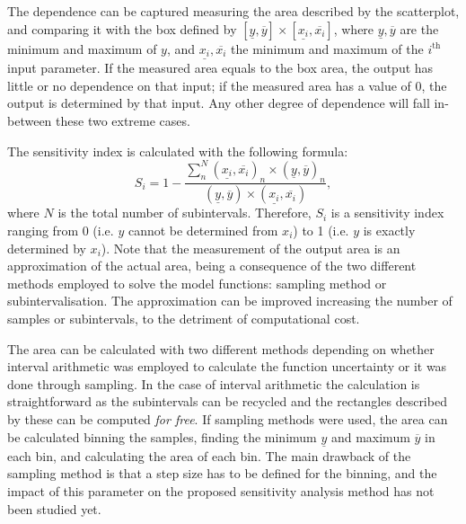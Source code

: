 \documentclass[twocolumn]{rps-esrel2022}
\begin{document}
The dependence can be captured measuring the area described by the scatterplot, and comparing it with the box defined by $[\underline{y},\overline{y}]\times[\underline{x_i},\overline{x_i}]$, where $\underline{y},\overline{y}$ are the minimum and maximum of $y$, and $\underline{x_i},\overline{x_i}$ the minimum and maximum of the $i^{\text{th}}$ input parameter.
If the measured area equals to the box area, the output has little or no dependence on that input;
if the measured area has a value of 0, the output is determined by that input. Any other degree of dependence will fall in-between these two extreme cases.

The sensitivity index is calculated with the following formula:
%
\begin{equation}
	S_i = 1 - \frac{\sum_n^N(\underline{x_i},\overline{x_i})_n\times(\underline{y},\overline{y})_n}{(\underline{y},\overline{y})\times(\underline{x_i},\overline{x_i})}{,}
\label{eq1}
\end{equation}
%
\noindent where $N$ is the total number of subintervals.
Therefore, $S_i$ is a sensitivity index ranging from 0 (i.e. $y$ cannot be determined from $x_i$) to 1 (i.e. $y$ is exactly determined by $x_i$).
Note that the measurement of the output area is an approximation of the actual area, being a consequence of the two different methods employed to solve the model functions: sampling method or subintervalisation.
The approximation can be improved increasing the number of samples or subintervals, to the detriment of computational cost.

The area can be calculated with two different methods depending on whether interval arithmetic was employed to calculate the function uncertainty or it was done through sampling. 
In the case of interval arithmetic the calculation is straightforward as the subintervals can be recycled and the rectangles described by these can be computed \textit{for free}.
If sampling methods were used, the area can be calculated binning the samples, finding the minimum $\underline{y}$ and maximum $\overline{y}$ in each bin, and calculating the area of each bin.
The main drawback of the sampling method is that a step size has to be defined for the binning, and the impact of this parameter on the proposed sensitivity analysis method has not been studied yet.
\end{document}
